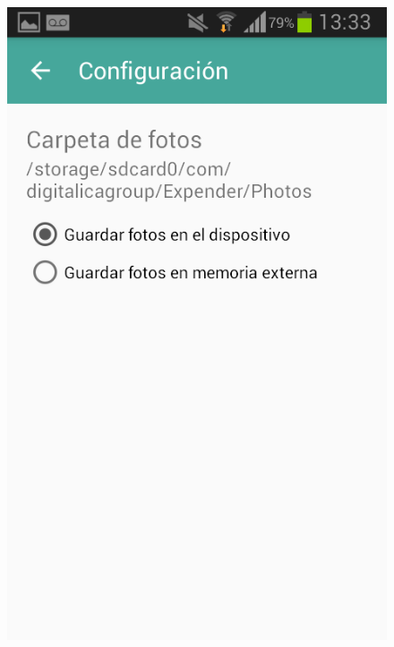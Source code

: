 \begin{figure}[ht]
\begin{minipage}{.5\textwidth}
\end{minipage}%
\begin{minipage}{.5\textwidth}
\centering
  \includegraphics[scale=0.30,type=png,ext=.png,read=.png]{imagenes/Screenshots/configuration}
  \captionsetup{justification=centering}
  \label{fig:interfazConfiguracion}
\end{minipage}
\end{figure}